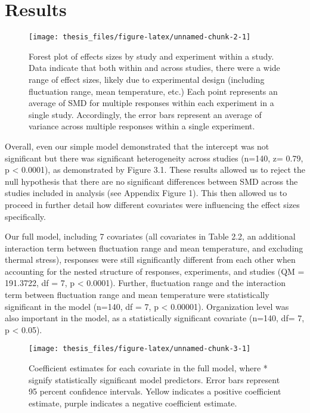 \documentclass[12pt,twoside]{reedthesis}
\begin{document}
\hypertarget{results}{%
\chapter{Results}\label{results}}
\begin{figure}

{\centering \texttt{[image: thesis\_files/figure-latex/unnamed-chunk-2-1]} 

}

\caption[Forest plot of effect sizes]{Forest plot of effects sizes by study and experiment within a study. Data indicate that both within and across studies, there were a wide range of effect sizes, likely due to experimental design (including fluctuation range, mean temperature, etc.) Each point represents an average of SMD for multiple responses within each experiment in a single study. Accordingly, the error bars represent an average of variance across multiple responses within a single experiment.}\label{fig:unnamed-chunk-2}
\end{figure}
Overall, even our simple model demonstrated that the intercept was not significant but there was significant heterogeneity across studies (n=140, z= 0.79, p \textless{} 0.0001), as demonstrated by Figure 3.1. These results allowed us to reject the null hypothesis that there are no significant differences between SMD across the studies included in analysis (see Appendix Figure 1). This then allowed us to proceed in further detail how different covariates were influencing the effect sizes specifically.

Our full model, including 7 covariates (all covariates in Table 2.2, an additional interaction term between fluctuation range and mean temperature, and excluding thermal stress), responses were still significantly different from each other when accounting for the nested structure of responses, experiments, and studies (QM = 191.3722, df = 7, p \textless{} 0.0001). Further, fluctuation range and the interaction term between fluctuation range and mean temperature were statistically significant in the model (n=140, df = 7, p \textless{} 0.00001). Organization level was also important in the model, as a statistically significant covariate (n=140, df= 7, p \textless{} 0.05).
\begin{figure}

{\centering \texttt{[image: thesis\_files/figure-latex/unnamed-chunk-3-1]} 

}

\caption[Coefficient estimates for full model]{Coefficient estimates for each covariate in the full model, where * signify statistically significant model predictors.  Error bars represent 95 percent confidence intervals. Yellow indicates a positive coefficient estimate, purple indicates a negative coefficient estimate.}\label{fig:unnamed-chunk-3}
\end{figure}
\clearpage
\end{document}
